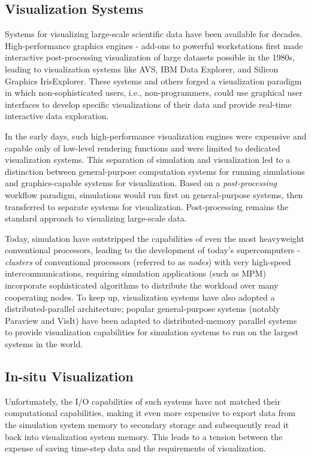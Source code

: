 \documentclass[journal]{IEEEtran}
\begin{document}
\subsection{Visualization Systems}
Systems for visualizing large-scale scientific data have been available for decades. High-performance graphics engines - add-ons to powerful workstations first made interactive post-processing visualization of large datasets possible in the 1980s, leading to visualization systems like AVS, IBM Data Explorer, and Silicon Graphics IrisExplorer. These systems and others forged a visualization paradigm in which non-sophisticated users, i.e., non-programmers, could use graphical user interfaces to develop specific visualizations of their data and provide real-time interactive data exploration.  

In the early days, such high-performance visualization engines were expensive and capable only of low-level rendering functions and were limited to dedicated visualization systems.  This separation of simulation and visualization led to a distinction between general-purpose computation systems for running simulations and graphics-capable systems for visualization.  Based on a \textit{post-processing} workflow paradigm, simulations would run first on general-purpose systems, then transferred to separate systems for visualization.  Post-processing remains the standard approach to visualizing large-scale data.

Today, simulation have outstripped the capabilities of even the most heavyweight conventional processors, leading to the development of today's supercomputers - \textit{clusters} of conventional processors (referred to as \textit{nodes}) with very high-speed intercommunications, requiring simulation applications (such as MPM) incorporate sophisticated algorithms to distribute the workload over many cooperating nodes. To keep up, visualization systems have also adopted a distributed-parallel architecture; popular general-purpose systems (notably Paraview and VisIt) have been adapted to distributed-memory parallel systems to provide visualization capabilities for simulation systems to run on the largest systems in the world.

\subsection{In-situ Visualization}

Unfortunately, the I/O capabilities of such systems have not matched their computational capabilities, making it even more expensive to export data from the simulation system memory to secondary storage and subsequently read it back into visualization system memory.  This leads to a tension between the expense of saving time-step data and the requirements of visualization.
  
\end{document}
